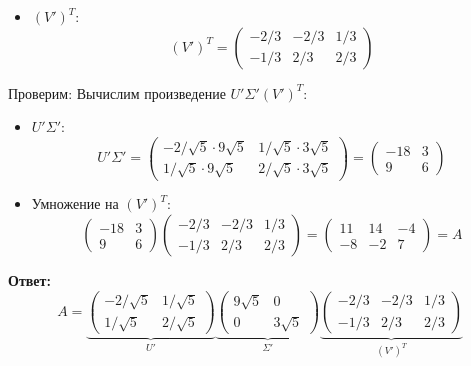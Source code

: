 \documentclass[a4paper]{article}
\begin{document}
\begin{enumerate}
\begin{itemize}
    \item \( (V')^T \):  
    \[
    (V')^T = \begin{pmatrix}
    -2/3 & -2/3 & 1/3 \\
    -1/3 & 2/3 & 2/3
    \end{pmatrix}
    \]
  \end{itemize}
  Проверим:
  Вычислим произведение \( U' \Sigma' (V')^T \):  
  \begin{itemize}
    \item \( U' \Sigma' \):  
    \[
    U' \Sigma' = \begin{pmatrix}
    -2/\sqrt{5} \cdot 9\sqrt{5} & 1/\sqrt{5} \cdot 3\sqrt{5} \\
    1/\sqrt{5} \cdot 9\sqrt{5} & 2/\sqrt{5} \cdot 3\sqrt{5}
    \end{pmatrix} = \begin{pmatrix}
    -18 & 3 \\
    9 & 6
    \end{pmatrix}
    \]
    \item Умножение на \( (V')^T \):  
    \[
    \begin{pmatrix}
    -18 & 3 \\
    9 & 6
    \end{pmatrix} \begin{pmatrix}
    -2/3 & -2/3 & 1/3 \\
    -1/3 & 2/3 & 2/3
    \end{pmatrix} = \begin{pmatrix}
    11 & 14 & -4 \\
    -8 & -2 & 7
    \end{pmatrix} = A
    \]
  \end{itemize}
  \textbf{Ответ: }\[
  A = \underbrace{\begin{pmatrix}
  -2/\sqrt{5} & 1/\sqrt{5} \\
  1/\sqrt{5} & 2/\sqrt{5}
  \end{pmatrix}}_{U'} \underbrace{\begin{pmatrix}
  9\sqrt{5} & 0 \\
  0 & 3\sqrt{5}
  \end{pmatrix}}_{\Sigma'} \underbrace{\begin{pmatrix}
  -2/3 & -2/3 & 1/3 \\
  -1/3 & 2/3 & 2/3
  \end{pmatrix}}_{(V')^T}
  \]  


\end{enumerate}
\end{document}
